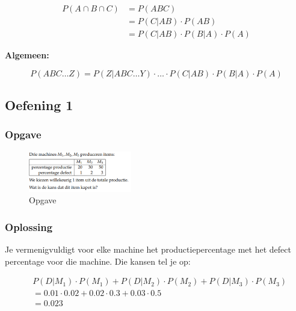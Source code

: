 \documentclass{article}
\begin{document}
\begin{equation}
    \begin{split}
        P(A \cap B \cap C) & = P(ABC)\\
        & = P(C | AB) \cdot P(AB)\\
        & = P(C | AB) \cdot P (B|A) \cdot P(A) 
    \end{split}
\end{equation}

\textbf{Algemeen:}

\begin{equation}
    P(ABC\dots Z) = P(Z|ABC\dots Y) \cdot \dots \cdot P (C| A B ) \cdot P(B|A) \cdot P(A)
\end{equation}

\subsection{Oefening 1}

\subsubsection{Opgave}

\begin{figure}[H]
    \centering
    \includegraphics[width=0.4\textwidth]{voorwaardelijke-kans-oef1.png}
    \caption{Opgave}
\end{figure}

\subsubsection{Oplossing}

Je vermenigvuldigt voor elke machine het productiepercentage met het defect percentage voor die machine. 
Die kansen tel je op:

\begin{center}
    \begin{align*}
        & P(D | M_1) \cdot P(M_1) + P(D | M_2) \cdot P(M_2) + P(D | M_3) \cdot P(M_3)\\
        & = 0.01 \cdot 0.02 + 0.02 \cdot 0.3 + 0.03 \cdot 0.5 \\
        & = 0.023
    \end{align*}
\end{center}
\end{document}
